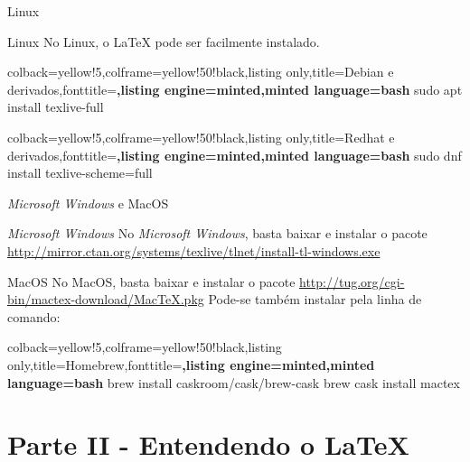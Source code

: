 \documentclass[10pt]{beamer}
\begin{document}
\begin{frame}[fragile]{Linux}
\begin{block}{Linux}
No Linux, o \LaTeX{} pode ser facilmente instalado.
\begin{tcblisting}{colback=yellow!5,colframe=yellow!50!black,listing only,title=Debian e derivados,fonttitle=\bfseries,listing engine=minted,minted language=bash}
sudo apt install texlive-full
\end{tcblisting}

\begin{tcblisting}{colback=yellow!5,colframe=yellow!50!black,listing only,title=Redhat e derivados,fonttitle=\bfseries,listing engine=minted,minted language=bash}
sudo dnf install texlive-scheme=full
\end{tcblisting}
\end{block}
\end{frame}

\begin{frame}[fragile]{\textit{Microsoft Windows} e MacOS}
\begin{block}{\textit{Microsoft Windows}}
No \textit{Microsoft Windows}, basta baixar e instalar o pacote \url{http://mirror.ctan.org/systems/texlive/tlnet/install-tl-windows.exe}
\end{block}

\begin{block}{MacOS}
No MacOS, basta baixar e instalar o pacote \url{http://tug.org/cgi-bin/mactex-download/MacTeX.pkg} 
Pode-se também instalar pela linha de comando:
\begin{tcblisting}{colback=yellow!5,colframe=yellow!50!black,listing only,title=Homebrew,fonttitle=\bfseries,listing engine=minted,minted language=bash}
brew install caskroom/cask/brew-cask
brew cask install mactex
\end{tcblisting}
\end{block}
\end{frame}

\section{Parte II - Entendendo o \LaTeX{}}
\end{document}

